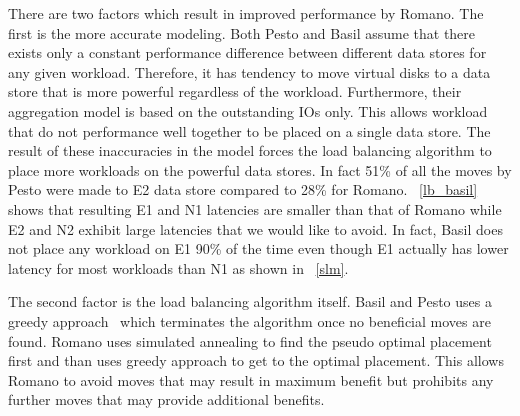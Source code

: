 There are two factors which result in improved performance by Romano.
The first is the more accurate modeling.
Both Pesto and Basil assume that there exists only a constant performance difference between different data stores for any given workload.
Therefore, it has tendency to move virtual disks to a data store that is more powerful regardless of the workload.
Furthermore, their aggregation model is based on the outstanding IOs only.
This allows workload that do not performance well together to be placed on a single data store.
The result of these inaccuracies in the model forces the load balancing algorithm to place more workloads on the powerful data stores.
In fact 51\% of all the moves by Pesto were made to E2 data store compared to 28\% for Romano.
\figurename~\ref{lb_basil} shows that resulting E1 and N1 latencies are smaller than that of Romano while E2 and N2 exhibit large latencies that we would like to avoid.
In fact, Basil does not place any workload on E1 90\% of the time even though E1 actually has lower latency for most workloads than N1 as shown in \figurename~\ref{slm}.

The second factor is the load balancing algorithm itself.
Basil and Pesto uses a greedy approach~\cite{gulati:2010} which terminates the algorithm once no beneficial moves are found.
Romano uses simulated annealing to find the pseudo optimal placement first and than uses greedy approach to get to the optimal placement.
This allows Romano to avoid moves that may result in maximum benefit but prohibits any further moves that may provide additional benefits.

